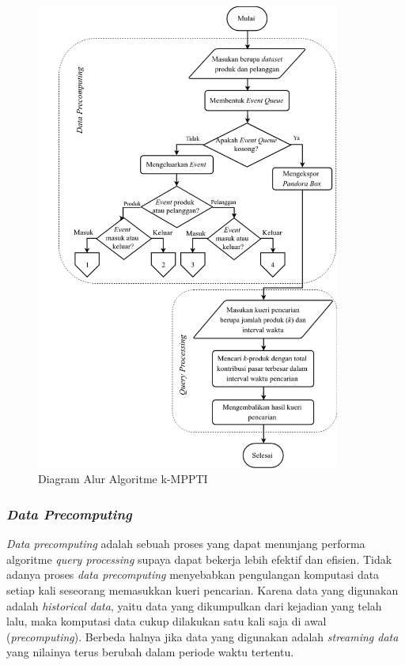 \begin{figure}[H]
	\centering
	\includegraphics[width=10cm]{assets/img/bab3/flowchart.png}
	\caption{Diagram Alur Algoritme k-MPPTI}
	\label{fig:diagram-alur1}
\end{figure}

\subsubsection{\textit{Data Precomputing}}
\tab \textit{Data precomputing} adalah sebuah proses yang dapat menunjang performa algoritme \textit{query processing} supaya dapat bekerja lebih efektif dan efisien. Tidak adanya proses \textit{data precomputing} menyebabkan pengulangan komputasi data setiap kali seseorang memasukkan kueri pencarian. Karena data yang digunakan adalah \textit{historical data}, yaitu data yang dikumpulkan dari kejadian yang telah lalu, maka komputasi data cukup dilakukan satu kali saja di awal (\textit{precomputing}). Berbeda halnya jika data yang digunakan adalah \textit{streaming data} yang nilainya terus berubah dalam periode waktu tertentu.
	
